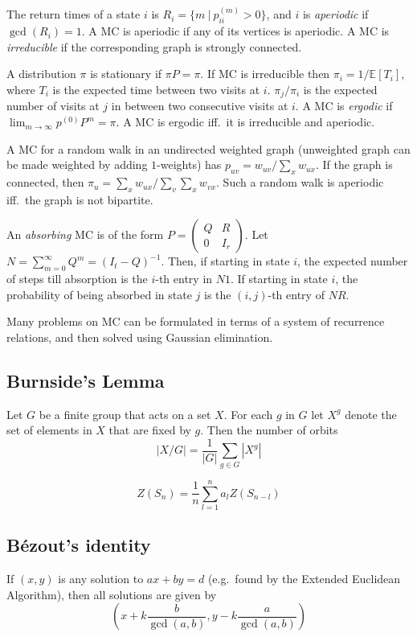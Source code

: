     The return times of a state $i$ is $R_i = \{m\ |\ p^{(m)}_{ii} > 0 \}$,
    and $i$ is \textit{aperiodic} if $\gcd(R_i) = 1$. A MC is aperiodic if
    any of its vertices is aperiodic. A MC is \textit{irreducible} if the
    corresponding graph is strongly connected.

    A distribution $\pi$ is stationary if $\pi P = \pi$. If MC is
    irreducible then $\pi_i = 1/\mathbb{E}[T_i]$, where $T_i$ is the
    expected time between two visits at $i$. $\pi_j/\pi_i$ is the expected
    number of visits at $j$ in between two consecutive visits at $i$. A MC
    is \textit{ergodic} if $\lim_{m\to\infty} p^{(0)} P^{m} = \pi$. A MC is
    ergodic iff.\ it is irreducible and aperiodic.

    A MC for a random walk in an undirected weighted graph (unweighted
    graph can be made weighted by adding $1$-weights) has $p_{uv} =
    w_{uv}/\sum_{x} w_{ux}$. If the graph is connected, then $\pi_u =
    \sum_{x} w_{ux} / \sum_{v}\sum_{x} w_{vx}$. Such a random walk is
    aperiodic iff.\ the graph is not bipartite.

    An \textit{absorbing} MC is of the form $P = \left(\begin{matrix} Q & R
    \\ 0 & I_r \end{matrix}\right)$. Let $N = \sum_{m=0}^\infty Q^m = (I_t
    - Q)^{-1}$. Then, if starting in state $i$, the expected number of
    steps till absorption is the $i$-th entry in $N1$. If starting in state
    $i$, the probability of being absorbed in state $j$ is the $(i,j)$-th
    entry of $NR$.

    Many problems on MC can be formulated in terms of a system of
    recurrence relations, and then solved using Gaussian elimination.

  \subsection{Burnside's Lemma}
    Let $G$ be a finite group that acts on a set $X$. For each $g$ in $G$
    let $X^g$ denote the set of elements in $X$ that are fixed by $g$. Then
    the number of orbits \[ |X/G| = \frac{1}{|G|} \sum_{g\in G} |X^g| \]

    \[
        Z(S_n) = \frac{1}{n} \sum_{l=1}^n a_l Z(S_{n-l})
    \]

  \subsection{Bézout's identity}
    If $(x,y)$ is any solution to $ax+by=d$ (e.g.\ found by the Extended
    Euclidean Algorithm), then all solutions are given by \[
    \left(x+k\frac{b}{\gcd(a,b)}, y-k\frac{a}{\gcd(a,b)}\right) \]

